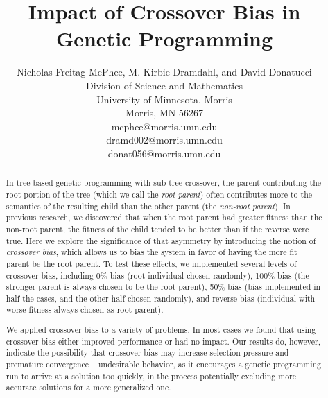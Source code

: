 \documentclass[12pt]{article}
\title{Impact of Crossover Bias in Genetic Programming}
\author{
 	Nicholas Freitag McPhee, M. Kirbie Dramdahl, and David Donatucci\\
        Division of Science and Mathematics\\
        University of Minnesota, Morris\\
        Morris, MN 56267\\
        mcphee@morris.umn.edu\\
        dramd002@morris.umn.edu\\
        donat056@morris.umn.edu\\
}
\date{}
\begin{document}
\pagestyle{plain}

\maketitle

\begin{abstract}


In tree-based genetic programming with sub-tree crossover, the parent contributing the root portion of the tree (which 
we call the \emph{root parent}) often contributes more to the semantics of the resulting child than the other parent (the 
\emph{non-root parent}). In previous research, we discovered that when the root parent had greater fitness than the 
non-root parent, the fitness of the child tended to be better than if the reverse were true. Here we explore the 
significance of that asymmetry by introducing the notion of \emph{crossover bias}, which allows us to bias the system 
in favor of having the more fit parent be the root parent. To test these effects, we implemented several levels of 
crossover bias, including 0\% bias 
(root individual chosen randomly), 100\% bias (the stronger parent is always chosen to be the root parent), 50\% bias 
(bias implemented in half 
the cases, and the other half chosen randomly), and reverse bias (individual with worse fitness always chosen 
as root parent). 

We applied crossover bias to a variety of problems. In most cases we found that using crossover bias 
either improved performance or had no impact. 
Our results do, however, indicate the possibility that 
crossover bias may increase selection pressure and premature convergence -- undesirable behavior, as it 
encourages a genetic programming run to arrive at a solution too quickly, in the process potentially excluding 
more accurate solutions for a more generalized one.


\end{abstract}
\end{document}
